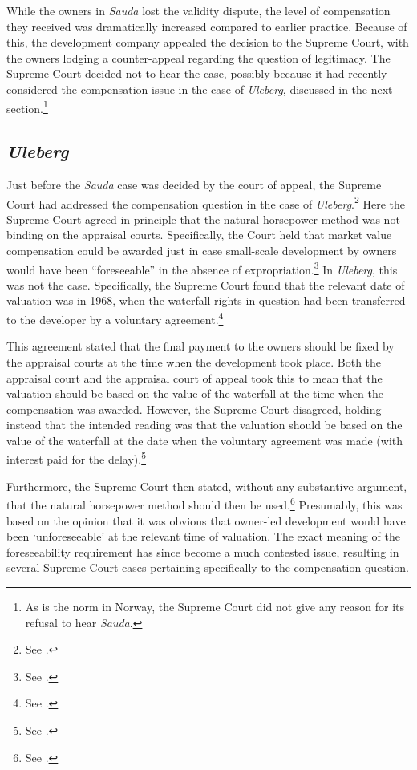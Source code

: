While the owners in {\it Sauda} lost the validity dispute, the level of compensation they received was dramatically increased compared to earlier practice. Because of this, the development company appealed the decision to the Supreme Court, with the owners lodging a counter-appeal regarding the question of legitimacy. The Supreme Court decided not to hear the case, possibly because it had recently considered the compensation issue in the case of {\it Uleberg}, discussed in the next section.\footnote{As is the norm in Norway, the Supreme Court did not give any reason for its refusal to hear {\it Sauda}.}

\subsection{{\it Uleberg}}\label{sec:5:5:2}

Just before the {\it Sauda} case was decided by the court of appeal, the Supreme Court had addressed the compensation question in the case of {\it Uleberg}.\footnote{See \cite{uleberg08}.} Here the Supreme Court agreed in principle that the natural horsepower method was not binding on the appraisal courts. Specifically, the Court held that market value compensation could be awarded just in case small-scale development by owners would have been ``foreseeable'' in the absence of expropriation.\footnote{See \cite[81]{uleberg08}.} In {\it Uleberg}, this was not the case. Specifically, the Supreme Court found that the relevant date of valuation was in 1968, when the waterfall rights in question had been transferred to the developer by a voluntary agreement.\footnote{See \cite[70]{uleberg08}.}

This agreement stated that the final payment to the owners should be fixed by the appraisal courts at the time when the development took place. Both the appraisal court and the appraisal court of appeal took this to mean that the valuation should be based on the value of the waterfall at the time when the compensation was awarded. However, the Supreme Court disagreed, holding instead that the intended reading was that the valuation should be based on the value of the waterfall at the date when the voluntary agreement was made (with interest paid for the delay).\footnote{See \cite[71]{uleberg08}.}

Furthermore, the Supreme Court then stated, without any substantive argument, that the natural horsepower method should then be used.\footnote{See \cite[62]{uleberg08}.} Presumably, this was based on the opinion that it was obvious that owner-led development would have been `unforeseeable' at the relevant time of valuation. The exact meaning of the foreseeability requirement has since become a much contested issue, resulting in several Supreme Court cases pertaining specifically to the compensation question.

